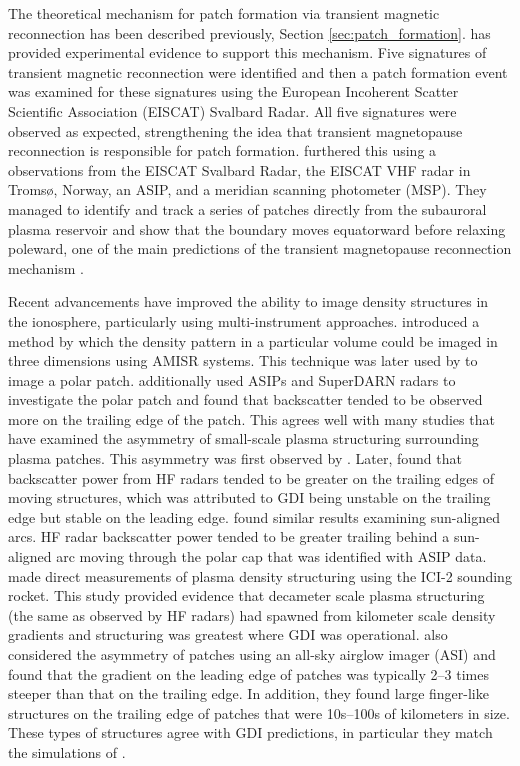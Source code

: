 The theoretical mechanism for patch formation via transient magnetic reconnection has been described previously, Section \ref{sec:patch_formation}.  \citet{Carlson2004} has provided experimental evidence to support this mechanism.  Five signatures of transient magnetic reconnection were identified and then a patch formation event was examined for these signatures using the European Incoherent Scatter Scientific Association (EISCAT) Svalbard Radar.  All five signatures were observed as expected, strengthening the idea that transient magnetopause reconnection is responsible for patch formation.  \citet{Carlson2006} furthered this using a observations from the EISCAT Svalbard Radar, the EISCAT VHF radar in Troms\o, Norway, an ASIP, and a meridian scanning photometer (MSP).  They managed to identify and track a series of patches directly from the subauroral plasma reservoir and show that the boundary moves equatorward before relaxing poleward, one of the main predictions of the transient magnetopause reconnection mechanism \citep{Lockwood1992}.

Recent advancements have improved the ability to image density structures in the ionosphere, particularly using multi-instrument approaches.  \citet{Semeter2009} introduced a method by which the density pattern in a particular volume could be imaged in three dimensions using AMISR systems.  This technique was later used by \citet{Dahlgren2012a,Dahlgren2012b} to image a polar patch.  \citet{Dahlgren2012b} additionally used ASIPs and SuperDARN radars to investigate the polar patch and found that backscatter tended to be observed more on the trailing edge of the patch.  This agrees well with many studies that have examined the asymmetry of small-scale plasma structuring surrounding plasma patches.  This asymmetry was first observed by \citet{Weber1984}.  Later, \citet{Milan2002b} found that backscatter power from HF radars tended to be greater on the trailing edges of moving structures, which was attributed to GDI being unstable on the trailing edge but stable on the leading edge.  \citet{Koustov2012} found similar results examining sun-aligned arcs.  HF radar backscatter power tended to be greater trailing behind a sun-aligned arc moving through the polar cap that was identified with ASIP data.  \citet{Moen2012} made direct measurements of plasma density structuring using the ICI-2 sounding rocket.  This study provided evidence that decameter scale plasma structuring (the same as observed by HF radars) had spawned from kilometer scale density gradients and structuring was greatest where GDI was operational.  \citet{Hosokawa2016} also considered the asymmetry of patches using an all-sky airglow imager (ASI) and found that the gradient on the leading edge of patches was typically 2--3 times steeper than that on the trailing edge.  In addition, they found large finger-like structures on the trailing edge of patches that were 10s--100s of kilometers in size.  These types of structures agree with GDI predictions, in particular they match the simulations of \citet{Gondarenko2004}.



